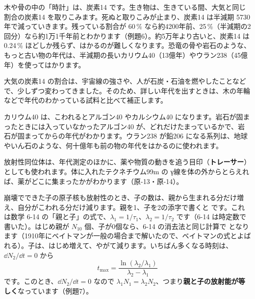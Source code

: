 \label{ph:原-12:hatena}木や骨の中の「時計」は、炭素14 です。生き物は、生きている間、大気と同じ割合の炭素14 を取りこみます。死ぬと取りこみが止まり、炭素14 は半減期 5730年で減っていきます。残っている割合が 60\,\% なら約4200年前、25\,\%（半減期の2回分）なら約1万1千年前とわかります（例題6）。約5万年より古いと、炭素14 は 0.24\,\% ほどしか残らず、はかるのが難しくなります。恐竜の骨や岩石のような、もっと古い物の年代は、半減期の長いカリウム40（13億年）やウラン238（45億年）を使ってはかります。

\noindent 大気の炭素14 の割合は、宇宙線の強さや、人が石炭・石油を燃やしたことなどで、少しずつ変わってきました。そのため、詳しい年代を出すときは、木の年輪などで年代のわかっている試料と比べて補正します。

カリウム40 は、こわれるとアルゴン40 やカルシウム40 になります。岩石が固まったときには入っていなかったアルゴン40 が、どれだけたまっているかで、岩石が固まってからの年代がわかります。ウラン238 が鉛206 になる系列は、地球やいん石のような、何十億年も前の物の年代をはかるのに使われます。

放射性同位体は、年代測定のほかに、薬や物質の動きを追う目印（\textbf{トレーサー}）としても使われます。体に入れたテクネチウム99m の γ線を体の外からとらえれば、薬がどこに集まったかがわかります（原-13・原-14）。

\phkokomade


\label{ph:原-12:sec8}
崩壊でできた子の原子核も放射性のとき、子の数は、親から生まれる分だけ増え、自分がこわれる分だけ減ります。親を1、子を2の添字で書くと
\label{ph:原-12:bateman}です。これは数学 6-14 の「親と子」の式で、$\lambda_1=1/\tau_1$、$\lambda_2=1/\tau_2$ です（6-14 は時定数で書いた）。はじめ親が $N_{10}$ 個、子が0個なら、6-14 の消去法と同じ計算で
となります（1910年にベイトマンが一般の場合まで解いたので、ベイトマンの式とよばれる）。子は、はじめ増えて、やがて減ります。いちばん多くなる時刻は、$\dd N_2/\dd t=0$ から
\[ t_{\max}=\frac{\ln(\lambda_2/\lambda_1)}{\lambda_2-\lambda_1} \]
です。このとき、$\dd N_2/\dd t=0$ なので $\lambda_1N_1=\lambda_2N_2$、つまり\textbf{親と子の放射能が等しく}なっています（例題7）。

